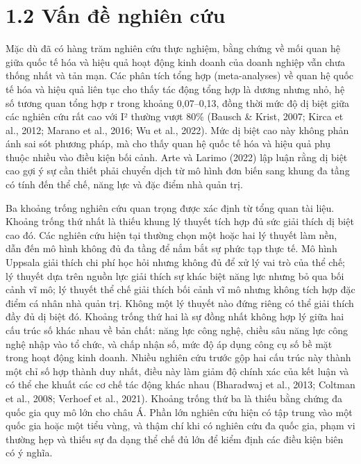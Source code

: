 \documentclass[
  a4paper,
  13pt]{extreport}
\begin{document}
\hypertarget{vux1ea5n-ux111ux1ec1-nghiuxean-cux1ee9u}{%
\section{1.2 Vấn đề nghiên
cứu}\label{vux1ea5n-ux111ux1ec1-nghiuxean-cux1ee9u}}

Mặc dù đã có hàng trăm nghiên cứu thực nghiệm, bằng chứng về mối quan hệ
giữa quốc tế hóa và hiệu quả hoạt động kinh doanh của doanh nghiệp vẫn
chưa thống nhất và tản mạn. Các phân tích tổng hợp (meta-analyses) về
quan hệ quốc tế hóa và hiệu quả liên tục cho thấy tác động tổng hợp là
dương nhưng nhỏ, hệ số tương quan tổng hợp r trong khoảng 0,07--0,13,
đồng thời mức độ dị biệt giữa các nghiên cứu rất cao với I² thường vượt
80\% (Bausch \& Krist, 2007; Kirca et al., 2012; Marano et al., 2016; Wu
et al., 2022). Mức dị biệt cao này không phản ánh sai sót phương pháp,
mà cho thấy quan hệ quốc tế hóa và hiệu quả phụ thuộc nhiều vào điều
kiện bối cảnh. Arte và Larimo (2022) lập luận rằng dị biệt cao gợi ý sự
cần thiết phải chuyển dịch từ mô hình đơn biến sang khung đa tầng có
tính đến thể chế, năng lực và đặc điểm nhà quản trị.

Ba khoảng trống nghiên cứu quan trọng được xác định từ tổng quan tài
liệu. Khoảng trống thứ nhất là thiếu khung lý thuyết tích hợp đủ sức
giải thích dị biệt cao đó. Các nghiên cứu hiện tại thường chọn một hoặc
hai lý thuyết làm nền, dẫn đến mô hình không đủ đa tầng để nắm bắt sự
phức tạp thực tế. Mô hình Uppsala giải thích chi phí học hỏi nhưng không
đủ để xử lý vai trò của thể chế; lý thuyết dựa trên nguồn lực giải thích
sự khác biệt năng lực nhưng bỏ qua bối cảnh vĩ mô; lý thuyết thể chế
giải thích bối cảnh vĩ mô nhưng không tích hợp đặc điểm cá nhân nhà quản
trị. Không một lý thuyết nào đứng riêng có thể giải thích đầy đủ dị biệt
đó. Khoảng trống thứ hai là sự đồng nhất không hợp lý giữa hai cấu trúc
số khác nhau về bản chất: năng lực công nghệ, chiều sâu năng lực công
nghệ nhập vào tổ chức, và chấp nhận số, mức độ áp dụng công cụ số bề mặt
trong hoạt động kinh doanh. Nhiều nghiên cứu trước gộp hai cấu trúc này
thành một chỉ số hợp thành duy nhất, điều này làm giảm độ chính xác của
kết luận và có thể che khuất các cơ chế tác động khác nhau (Bharadwaj et
al., 2013; Coltman et al., 2008; Verhoef et al., 2021). Khoảng trống thứ
ba là thiếu bằng chứng đa quốc gia quy mô lớn cho châu Á. Phần lớn
nghiên cứu hiện có tập trung vào một quốc gia hoặc một tiểu vùng, và
thậm chí khi có nghiên cứu đa quốc gia, phạm vi thường hẹp và thiếu sự
đa dạng thể chế đủ lớn để kiểm định các điều kiện biên có ý nghĩa.
\end{document}
